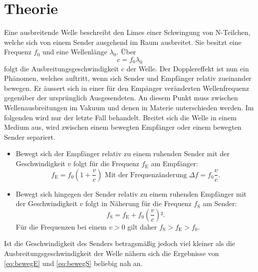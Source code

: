 
\section{Theorie}
\label{sec:Theorie}
Eine ausbreitende Welle beschreibt den Limes einer Schwingung von N-Teilchen,
 welche sich von einem Sender ausgehend im Raum ausbreitet. Sie besitzt eine Frequenz $f_0$ und eine Wellenlänge $\lambda_0$. Über
 \begin{equation}
   c = f_0 \lambda_0 \label{eq:c}
   \end{equation}
   folgt die Ausbreitungsgeschwindigkeit $c$ der Welle.
Der Dopplereffekt ist nun ein Phänomen, welches auftritt,
 wenn sich Sender und Empfänger relativ zueinander bewegen. Er äussert sich in
  einer für den Empänger veränderten Wellenfrequenz gegenüber der ursprünglich
   Ausgesendeten. An diesem Punkt muss zwischen Wellenausbreitungen im Vakuum
    und denen in Materie unterschieden werden. Im folgenden wird nur der letzte
     Fall behandelt. Breitet sich die Welle in einem
     Medium aus, wird zwischen einem bewegten Empfänger oder einem bewegten
      Sender separiert.
\begin{itemize}
\item Bewegt sich der Empfänger relativ zu einem ruhenden Sender mit der
 Geschwindigkeit $v$ folgt für die Frequenz $f_\text{E}$ am Empfänger:
 \begin{equation}
   f_\text{E} = f_0\left(1+\frac{v}{c}\right) \text{ Mit der Frequenzänderung }\Delta f = f_0\frac{v}{c}\text{.}\label{eq:bewegE}
   \end{equation}
   \item Bewegt sich hingegen der Sender relativ zu einem ruhenden Empfänger mit der
    Geschwindigkeit $v$ folgt in Näherung für die Frequenz $f_\text{S}$ am Sender:
    \begin{equation}
      f_\text{S} = f_\text{E} + f_0\left(\frac{v}{c}\right)²\text{.}\label{eq:bewegS}
      \end{equation}
      Für die Frequenzen bei einem $v > 0$ gilt daher $f_\text{S} > f_\text{E} > f_0$.
\end{itemize}
Ist die Geschwindigkeit des Senders betragsmäßig jedoch viel kleiner als
 die Ausbreitungsgeschwindigkeit der Welle nähern sich die Ergebnisse von
  \eqref{eq:bewegE} und \eqref{eq:bewegS} beliebig nah an.
